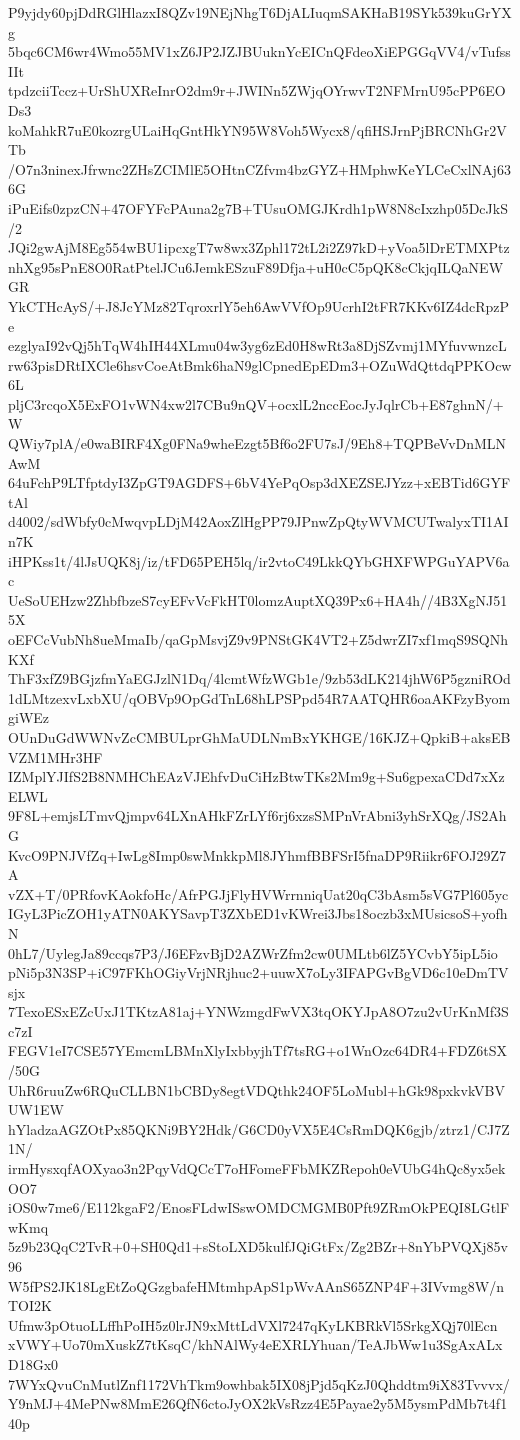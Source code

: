 P9yjdy60pjDdRGlHlazxI8QZv19NEjNhgT6DjALIuqmSAKHaB19SYk539kuGrYXg
5bqc6CM6wr4Wmo55MV1xZ6JP2JZJBUuknYcEICnQFdeoXiEPGGqVV4/vTufssIIt
tpdzciiTccz+UrShUXReInrO2dm9r+JWINn5ZWjqOYrwvT2NFMrnU95cPP6EODs3
koMahkR7uE0kozrgULaiHqGntHkYN95W8Voh5Wycx8/qfiHSJrnPjBRCNhGr2VTb
/O7n3ninexJfrwnc2ZHsZCIMlE5OHtnCZfvm4bzGYZ+HMphwKeYLCeCxlNAj636G
iPuEifs0zpzCN+47OFYFcPAuna2g7B+TUsuOMGJKrdh1pW8N8cIxzhp05DcJkS/2
JQi2gwAjM8Eg554wBU1ipcxgT7w8wx3Zphl172tL2i2Z97kD+yVoa5lDrETMXPtz
nhXg95sPnE8O0RatPtelJCu6JemkESzuF89Dfja+uH0cC5pQK8cCkjqILQaNEWGR
YkCTHcAyS/+J8JcYMz82TqroxrlY5eh6AwVVfOp9UcrhI2tFR7KKv6IZ4dcRpzPe
ezglyaI92vQj5hTqW4hIH44XLmu04w3yg6zEd0H8wRt3a8DjSZvmj1MYfuvwnzcL
rw63pisDRtIXCle6hsvCoeAtBmk6haN9glCpnedEpEDm3+OZuWdQttdqPPKOcw6L
pljC3rcqoX5ExFO1vWN4xw2l7CBu9nQV+ocxlL2nccEocJyJqlrCb+E87ghnN/+W
QWiy7plA/e0waBIRF4Xg0FNa9wheEzgt5Bf6o2FU7sJ/9Eh8+TQPBeVvDnMLNAwM
64uFchP9LTfptdyI3ZpGT9AGDFS+6bV4YePqOsp3dXEZSEJYzz+xEBTid6GYFtAl
d4002/sdWbfy0cMwqvpLDjM42AoxZlHgPP79JPnwZpQtyWVMCUTwalyxTI1AIn7K
iHPKss1t/4lJsUQK8j/iz/tFD65PEH5lq/ir2vtoC49LkkQYbGHXFWPGuYAPV6ac
UeSoUEHzw2ZhbfbzeS7cyEFvVcFkHT0lomzAuptXQ39Px6+HA4h//4B3XgNJ515X
oEFCcVubNh8ueMmaIb/qaGpMsvjZ9v9PNStGK4VT2+Z5dwrZI7xf1mqS9SQNhKXf
ThF3xfZ9BGjzfmYaEGJzlN1Dq/4lcmtWfzWGb1e/9zb53dLK214jhW6P5gzniROd
1dLMtzexvLxbXU/qOBVp9OpGdTnL68hLPSPpd54R7AATQHR6oaAKFzyByomgiWEz
OUnDuGdWWNvZcCMBULprGhMaUDLNmBxYKHGE/16KJZ+QpkiB+aksEBVZM1MHr3HF
IZMplYJIfS2B8NMHChEAzVJEhfvDuCiHzBtwTKs2Mm9g+Su6gpexaCDd7xXzELWL
9F8L+emjsLTmvQjmpv64LXnAHkFZrLYf6rj6xzsSMPnVrAbni3yhSrXQg/JS2AhG
KvcO9PNJVfZq+IwLg8Imp0swMnkkpMl8JYhmfBBFSrI5fnaDP9Riikr6FOJ29Z7A
vZX+T/0PRfovKAokfoHc/AfrPGJjFlyHVWrrnniqUat20qC3bAsm5sVG7Pl605yc
IGyL3PicZOH1yATN0AKYSavpT3ZXbED1vKWrei3Jbs18oczb3xMUsicsoS+yofhN
0hL7/UylegJa89ccqs7P3/J6EFzvBjD2AZWrZfm2cw0UMLtb6lZ5YCvbY5ipL5io
pNi5p3N3SP+iC97FKhOGiyVrjNRjhuc2+uuwX7oLy3IFAPGvBgVD6c10eDmTVsjx
7TexoESxEZcUxJ1TKtzA81aj+YNWzmgdFwVX3tqOKYJpA8O7zu2vUrKnMf3Sc7zI
FEGV1eI7CSE57YEmcmLBMnXlyIxbbyjhTf7tsRG+o1WnOzc64DR4+FDZ6tSX/50G
UhR6ruuZw6RQuCLLBN1bCBDy8egtVDQthk24OF5LoMubl+hGk98pxkvkVBVUW1EW
hYladzaAGZOtPx85QKNi9BY2Hdk/G6CD0yVX5E4CsRmDQK6gjb/ztrz1/CJ7Z1N/
irmHysxqfAOXyao3n2PqyVdQCcT7oHFomeFFbMKZRepoh0eVUbG4hQc8yx5ekOO7
iOS0w7me6/E112kgaF2/EnosFLdwISswOMDCMGMB0Pft9ZRmOkPEQI8LGtlFwKmq
5z9b23QqC2TvR+0+SH0Qd1+sStoLXD5kulfJQiGtFx/Zg2BZr+8nYbPVQXj85v96
W5fPS2JK18LgEtZoQGzgbafeHMtmhpApS1pWvAAnS65ZNP4F+3IVvmg8W/nTOI2K
Ufmw3pOtuoLLffhPoIH5z0lrJN9xMttLdVXl7247qKyLKBRkVl5SrkgXQj70lEcn
xVWY+Uo70mXuskZ7tKsqC/khNAlWy4eEXRLYhuan/TeAJbWw1u3SgAxALxD18Gx0
7WYxQvuCnMutlZnf1172VhTkm9owhbak5IX08jPjd5qKzJ0Qhddtm9iX83Tvvvx/
Y9nMJ+4MePNw8MmE26QfN6ctoJyOX2kVsRzz4E5Payae2y5M5ysmPdMb7t4f140p
